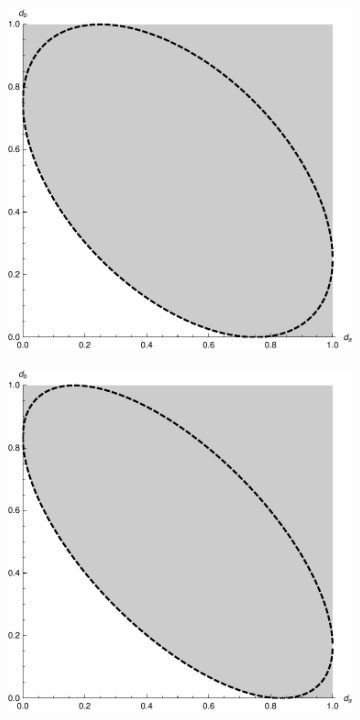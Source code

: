 \begin{figure}
\begin{center}
\begin{subfigure}[t]{0.4\textwidth}
    \end{subfigure}\\
    \begin{subfigure}[t]{0.4\textwidth}
      \includegraphics[width=\textwidth]{fourier-ur-4}
    \end{subfigure}\quad
    \begin{subfigure}[t]{0.4\textwidth}
      \includegraphics[width=\textwidth]{fourier-ur-6}

\end{subfigure}
\end{center}
\end{figure}
